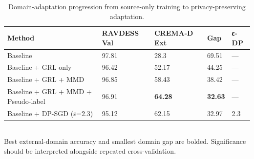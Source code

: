 \begin{table}[t]
\centering
\caption{Domain-adaptation progression from source-only training to privacy-preserving adaptation.}
\label{tab:paemdt_domain_adaptation}
\small
\begin{tabular}{lllll}
\toprule
Method & RAVDESS Val & CREMA-D Ext & Gap & ε-DP \\
\midrule
Baseline & 97.81 & 28.3 & 69.51 & — \\
Baseline + GRL only & 96.42 & 52.17 & 44.25 & — \\
Baseline + GRL + MMD & 96.85 & 58.43 & 38.42 & — \\
Baseline + GRL + MMD + Pseudo-label & 96.91 & \textbf{64.28} & \textbf{32.63} & — \\
Baseline + DP-SGD (ε=2.3) & 95.12 & 62.15 & 32.97 & 2.3 \\
\bottomrule
\end{tabular}
\\[2pt]\footnotesize{Best external-domain accuracy and smallest domain gap are bolded. Significance should be interpreted alongside repeated cross-validation.}
\end{table}

